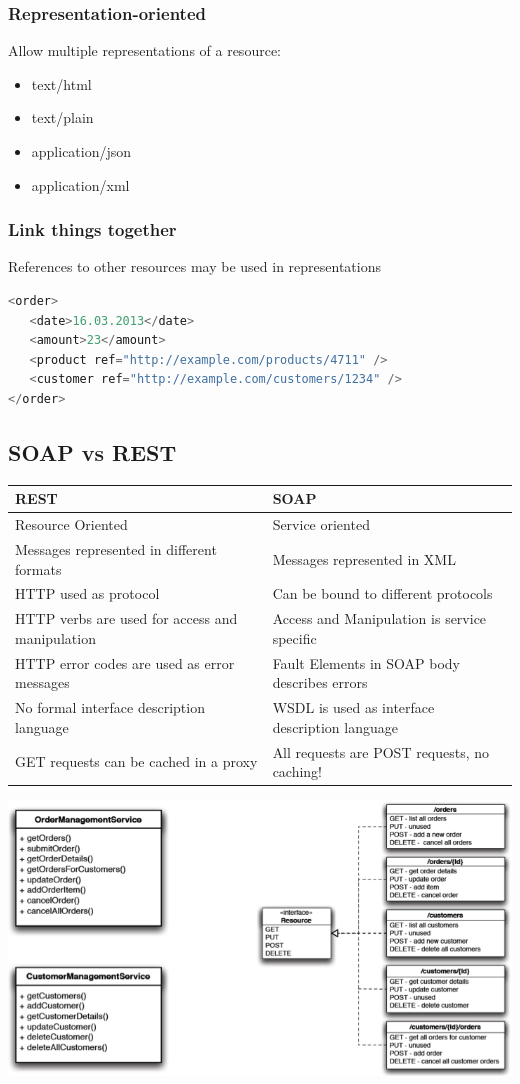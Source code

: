 \documentclass[10pt]{article}
\begin{document}
\subsubsection{Representation-oriented}
Allow multiple representations of a resource: 
\begin{itemize}
	\item text/html
	\item text/plain
	\item application/json
	\item application/xml
\end{itemize}
\subsubsection{Link things together}
References to other resources may be used in representations
\begin{lstlisting}[language=Java, caption=example, style=JavaStyle]
<order>
   <date>16.03.2013</date>
   <amount>23</amount>
   <product ref="http://example.com/products/4711" />
   <customer ref="http://example.com/customers/1234" />
</order>
\end{lstlisting}

\subsection{SOAP vs REST}
\begin{tabular}{l | l}
	\textbf{REST} & \textbf{SOAP} \\
	\hline
	Resource Oriented & Service oriented \\
	Messages represented in different formats & Messages represented in XML \\
	HTTP used as protocol & Can be bound to different protocols \\
	HTTP verbs are used for access and manipulation & Access and Manipulation is service specific \\
	HTTP error codes are used as error messages & Fault Elements in SOAP body describes errors \\
	No formal interface description language & WSDL is used as interface description language \\
	GET requests can be cached in a proxy & All requests are POST requests, no caching!
\end{tabular}
\begin{center}
	\includegraphics[scale=0.5]{soap-rest.png}
\end{center}
\end{document}

